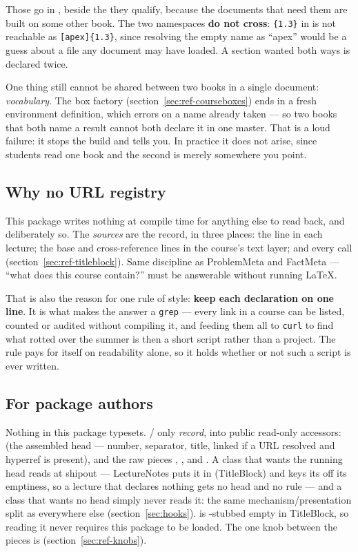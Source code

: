Those go in , beside the  they qualify,
because the documents that need them are built on some other book. The two
namespaces \textbf{do not cross}: \texttt{\{1.3\}} in
 is not reachable as
\texttt{[apex]\{1.3\}}, since resolving the empty name as
``apex'' would be a guess about a file any document may have loaded. A
section wanted both ways is declared twice.

One thing still cannot be shared between two books in a single document:
\emph{vocabulary}. The box factory
(section~\ref{sec:ref-courseboxes}) ends in a fresh environment
definition, which errors on a name already taken --- so two books that
both name a result cannot both declare it in one master. That is a loud
failure: it stops the build and tells you. In practice it does not arise,
since students read one book and the second is merely somewhere you
point.

\subsection*{Why no URL registry}

This package writes nothing at compile time for anything else to read
back, and deliberately so. The \emph{sources} are the record, in three
places: the  line in each lecture; the base and
cross-reference lines in the course's text layer; and every 
call (section~\ref{sec:ref-titleblock}). Same discipline as ProblemMeta and
FactMeta --- ``what does this course contain?'' must be answerable
without running \LaTeX.

That is also the reason for one rule of style: \textbf{keep each
declaration on one line}. It is what makes the answer a \texttt{grep} ---
every link in a course can be listed, counted or audited without
compiling it, and feeding them all to \texttt{curl} to find what rotted
over the summer is then a short script rather than a project. The rule
pays for itself on readability alone, so it holds whether or not such a
script is ever written.

\subsection*{For package authors}

Nothing in this package typesets.  /
 only \emph{record}, into public read-only accessors:
 (the assembled head --- number, separator, title,
linked if a URL resolved and hyperref is present), and the raw pieces
, ,  and
. A class that wants the running head reads
 at shipout --- LectureNotes puts it in
 (TitleBlock) and keys its  off its
emptiness, so a lecture that declares nothing gets no head and no rule
--- and a class that wants no head simply never reads it: the same
mechanism/presentation split as everywhere else
(section~\ref{sec:hooks}).  is
-stubbed empty in TitleBlock, so reading it never
requires this package to be loaded. The one knob between the pieces is
 (section~\ref{sec:ref-knobs}).

